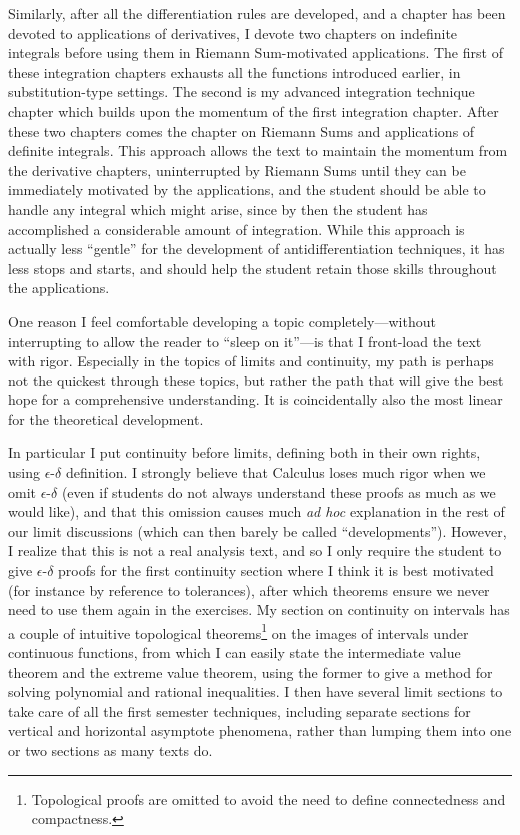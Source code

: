 Similarly, after all the differentiation rules are developed, 
and a chapter has been devoted to applications of derivatives,
I devote two chapters  on indefinite integrals before using them
in Riemann Sum-motivated applications.  The first of these
integration chapters exhausts all
the functions introduced earlier, in substitution-type settings.
The second is my advanced integration technique chapter which
builds upon the momentum of the first integration chapter.
After these two chapters comes the chapter on Riemann Sums and
applications of definite integrals.
This approach allows the
text to maintain the momentum from the derivative chapters,
uninterrupted by Riemann Sums until they can be immediately
motivated by the applications, and the student should be able to handle any
integral which might arise, since by then
the student has accomplished
a considerable amount of integration.  While this approach is
actually less ``gentle'' for the development of antidifferentiation
techniques, it has less stops and starts, and should help the student
retain those skills throughout the applications.


\bigskip

\bigskip

One reason I feel comfortable developing a topic completely---without 
interrupting to allow the reader to ``sleep on it''---is that I 
front-load the text with
rigor.  Especially in the topics of limits and continuity, my
path is perhaps not the quickest through these topics, but
rather the path that will give the best hope for a comprehensive
understanding.  It is coincidentally also the
most linear for the theoretical development.

In particular I put continuity before
limits, defining both in their own rights,
using $\epsilon$-$\delta$ definition.  I strongly believe that Calculus
loses much rigor when we omit $\epsilon$-$\delta$ (even if 
students do not always understand these proofs as much
as we would like), and that this omission causes much
{\it ad hoc} explanation in the rest of our limit discussions
(which can then barely be called ``developments'').  
However, I realize that this is not a real analysis text,
and so I only require
the student to give $\epsilon$-$\delta$ proofs for the 
first continuity section where I think it is best motivated
(for instance by reference to tolerances), 
after which theorems ensure
we never need to use them again in the exercises. My section on
continuity on intervals has a couple of intuitive 
topological theorems\footnote{Topological  proofs are omitted to avoid
the need to define connectedness and compactness.}
on the images of intervals under continuous functions,
from which I can easily state the intermediate value
theorem and the extreme value theorem, using the former
to give a method for solving
polynomial and rational inequalities.  I then
have several limit sections to take care of all the
first semester techniques, including separate sections
for vertical and 
horizontal asymptote phenomena, rather than lumping them into
one or two sections as many texts do.

